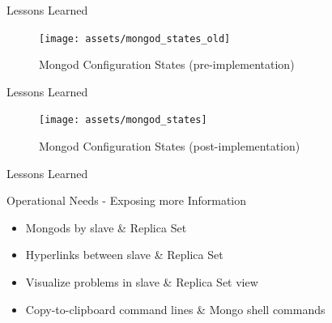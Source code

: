 \documentclass[11pt,aspectratio=169]{beamer}
\begin{document}
    \begin{frame}{Lessons Learned}
      \begin{figure}
        \centering
        \texttt{[image: assets/mongod\_states\_old]}
              \caption{Mongod Configuration States (pre-implementation)}
        \label{fig:mongodstates}
        \end{figure}
    \end{frame}
    \begin{frame}{Lessons Learned}
      \begin{figure}
        \centering
        \texttt{[image: assets/mongod\_states]}
              \caption{Mongod Configuration States (post-implementation)}
        \label{fig:mongodstates}
        \end{figure}
    \end{frame}
\begin{frame}{Lessons Learned}

      Operational Needs - Exposing more Information

      \pause
      \begin{itemize}
              \item<+-> Mongods by slave \& Replica Set
              \item<+-> Hyperlinks between slave \& Replica Set
              \item<+-> Visualize problems in slave \& Replica Set view
              \item<+-> Copy-to-clipboard command lines \& Mongo shell commands
      \end{itemize}
     
    \end{frame}
\end{document}
